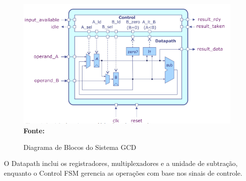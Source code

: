 \documentclass[a4paper,11pt]{article} %
\begin{document}
\begin{figure}[ht]
    \centering
    \caption{Diagrama de Blocos do Sistema GCD}
    \includegraphics[width=17cm,angle=0]{imgs/diagram_block_control_datapath.png}
    \\\textbf{Fonte:} \cite{cse_taylor_michael}
    \label{fig:diagram_block}
\end{figure}

O Datapath inclui os registradores, multiplexadores e a unidade de subtração,
enquanto o Control FSM gerencia as operações com base nos sinais de controle.

\end{document}
